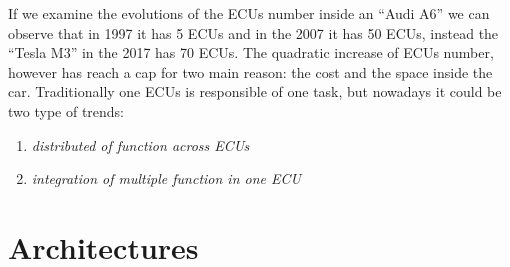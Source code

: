 If we examine the evolutions of the ECUs number inside an ``Audi A6'' we can observe that in 1997 it has 5 ECUs and in the 2007 it has 50 ECUs, instead the ``Tesla M3'' in the 2017 has 70 ECUs. The quadratic increase of ECUs number, however has reach a cap for two main reason: the cost and the space inside the car. Traditionally one ECUs is responsible of one task, but nowadays it could be two type of trends:
\begin{enumerate}[nosep]
    \item \textit{distributed of function across ECUs}
    \item \textit{integration of multiple function in one ECU}
\end{enumerate}

\section{Architectures}

